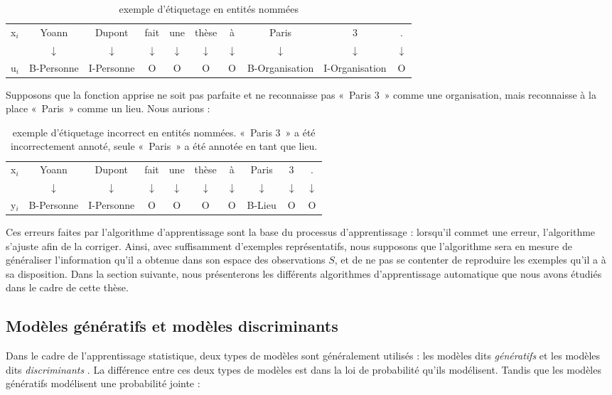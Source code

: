 \documentclass[12pt,a4paper,times,twoside,openright]{report}
\begin{document}
\begin{table}[ht!]
\centering
\begin{tabular}{lccccccccc}
x$_{i}$ & Yoann & Dupont & fait & une & thèse & à & Paris & 3 & . \\
        & $\downarrow$ & $\downarrow$ & $\downarrow$ & $\downarrow$ & $\downarrow$ & $\downarrow$ & $\downarrow$ & $\downarrow$ & $\downarrow$ \\
u$_{i}$ & B-Personne & I-Personne & O & O & O & O & B-Organisation & I-Organisation & O \\
\end{tabular}
\caption{exemple d'étiquetage en entités nommées}
\label{tab:ner-example}
\end{table}

Supposons que la fonction apprise ne soit pas parfaite et ne reconnaisse pas «\ Paris 3\ » comme une organisation, mais reconnaisse à la place «\ Paris\ » comme un lieu. Nous aurions :

\begin{table}[ht!]
\centering
\begin{tabular}{lccccccccc}
x$_{i}$ & Yoann & Dupont & fait & une & thèse & à & Paris & 3 & . \\
        & $\downarrow$ & $\downarrow$ & $\downarrow$ & $\downarrow$ & $\downarrow$ & $\downarrow$ & $\downarrow$ & $\downarrow$ & $\downarrow$ \\
y$_{i}$ & B-Personne & I-Personne & O & O & O & O & B-Lieu & O & O \\
\end{tabular}
\caption{exemple d'étiquetage incorrect en entités nommées. «\ Paris 3\ » a été incorrectement annoté, seule «\ Paris\ » a été annotée en tant que lieu.}
\label{tab:ner-tagging-example}
\end{table}

Ces erreurs faites par l'algorithme d'apprentissage sont la base du processus d'apprentissage : lorsqu'il commet une erreur, l'algorithme s'ajuste afin de la corriger. Ainsi, avec suffisamment d'exemples représentatifs, nous supposons que l'algorithme sera en mesure de généraliser l'information qu'il a obtenue dans son espace des observations $S$, et de ne pas se contenter de reproduire les exemples qu'il a à sa disposition. Dans la section suivante, nous présenterons les différents algorithmes d'apprentissage automatique que nous avons étudiés dans le cadre de cette thèse.


        
        \subsection{Modèles génératifs et modèles discriminants}
        \label{subsec:generative-vs-discriminative}
Dans le cadre de l'apprentissage statistique, deux types de modèles sont généralement utilisés : les modèles dits \emph{génératifs} et les modèles dits \emph{discriminants} \citep{ng2002discriminative}. La différence entre ces deux types de modèles est dans la loi de probabilité qu'ils modélisent. Tandis que les modèles génératifs modélisent une probabilité jointe :
\end{document}
